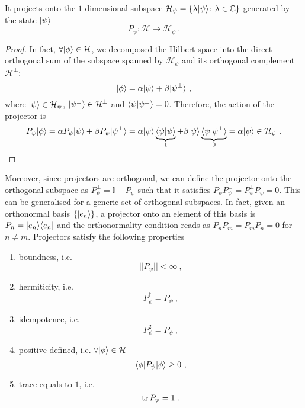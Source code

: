     It projects onto the $1$-dimensional subspace $\mathcal H_\psi = \{\lambda \vert\psi\rangle \colon \lambda \in \mathbb C\}$ generated by the state $\vert\psi\rangle$
    \begin{equation*}
        P_\psi \colon \mathcal H \rightarrow \mathcal H_\psi ~.
    \end{equation*}
    \begin{proof}
        In fact, $\forall \vert\phi\rangle \in \mathcal H$, we decomposed the Hilbert space into the direct orthogonal sum of the subspace spanned by $\mathcal H_{\psi}$ and its orthogonal complement $\mathcal H^\perp$:
        \begin{equation*}
            \vert\phi\rangle = \alpha \vert\psi\rangle + \beta \vert\psi^\perp\rangle ~,
        \end{equation*}
        where $\vert\psi\rangle \in \mathcal H_\psi$, $\vert\psi^\perp\rangle \in \mathcal H^\perp$ and $\langle\psi\vert\psi^\perp\rangle = 0$. Therefore, the action of the projector is
        \begin{equation*}
            P_\psi \vert\phi\rangle = \alpha P_\psi \vert\psi\rangle + \beta P_\psi \vert\psi^\perp\rangle = \alpha \vert\psi\rangle \underbrace{\langle\psi\vert\psi\rangle}_1 + \beta \vert\psi\rangle \underbrace{\langle\psi\vert\psi^\perp\rangle}_0 = \alpha \vert\psi\rangle \in \mathcal H_\psi ~.
        \end{equation*}
    \end{proof}
    Moreover, since projectors are orthogonal, we can define the projector onto the orthogonal subspace as $P_\psi^\perp = \mathbb I - P_\psi$ such that it satisfies $P_\psi P_\psi^\perp = P_\psi^\perp P_\psi = 0$. This can be generalised for a generic set of orthogonal subspaces. In fact, given an orthonormal basis $\{\vert e_n\rangle\}$, a projector onto an element of this basis is $P_n = \vert e_n\rangle \langle e_n\vert$ and the orthonormality condition reads as $P_n P_m = P_m P_n = 0$ for $n \neq m$. Projectors satisfy the following properties 
    \begin{enumerate}
        \item boundness, i.e. 
            \begin{equation*}
                ||P_\psi|| < \infty~,
            \end{equation*}
        \item hermiticity, i.e. 
            \begin{equation*}
                P_\psi^\dagger = P_\psi ~,
            \end{equation*}
        \item idempotence, i.e. 
            \begin{equation}\label{idem}
                P_\psi^2 = P_\psi ~,
            \end{equation}
        \item positive defined, i.e. $\forall \vert\phi\rangle \in \mathcal H$
            \begin{equation*}
                \langle\phi\vert P_\psi \vert\phi\rangle \geq 0 ~,
            \end{equation*}
        \item trace equals to $1$, i.e. 
            \begin{equation*}
                \operatorname{tr} P_\psi = 1 ~.
            \end{equation*}
    \end{enumerate}
